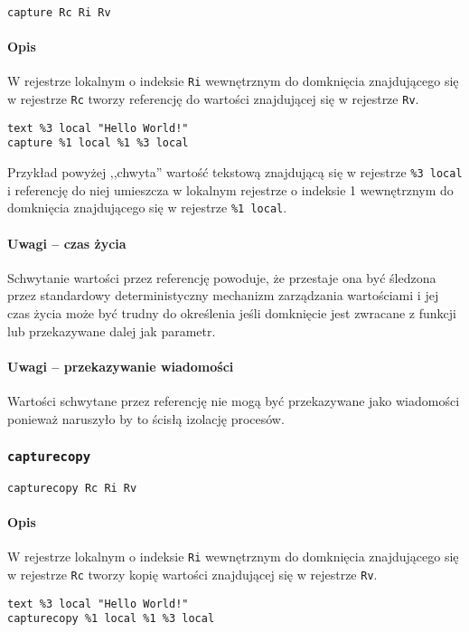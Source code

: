 \begin{lstlisting}
capture Rc Ri Rv
\end{lstlisting}

\paragraph*{Opis} W rejestrze lokalnym o indeksie \texttt{Ri} wewnętrznym do
domknięcia znajdującego się w rejestrze \texttt{Rc} tworzy referencję do
wartości znajdującej się w rejestrze \texttt{Rv}.
\begin{lstlisting}
text %3 local "Hello World!"
capture %1 local %1 %3 local
\end{lstlisting}

Przykład powyżej ,,chwyta'' wartość tekstową znajdującą się w rejestrze
\texttt{\%3~local} i referencję do niej umieszcza w lokalnym rejestrze o
indeksie 1 wewnętrznym do domknięcia znajdującego się w rejestrze
\texttt{\%1~local}.

\paragraph*{Uwagi -- czas życia} Schwytanie wartości przez referencję powoduje,
że przestaje ona być śledzona przez standardowy deterministyczny mechanizm
zarządzania wartościami i jej czas życia może być trudny do określenia jeśli
domknięcie jest zwracane z funkcji lub przekazywane dalej jak parametr.

\paragraph*{Uwagi -- przekazywanie wiadomości} Wartości schwytane przez
referencję nie mogą być przekazywane jako wiadomości ponieważ naruszyło by to
ścisłą izolację procesów.

\subsubsection{\texttt{capturecopy}}

\begin{lstlisting}
capturecopy Rc Ri Rv
\end{lstlisting}

\paragraph*{Opis} W rejestrze lokalnym o indeksie \texttt{Ri} wewnętrznym do
domknięcia znajdującego się w rejestrze \texttt{Rc} tworzy kopię wartości
znajdującej się w rejestrze \texttt{Rv}.
\begin{lstlisting}
text %3 local "Hello World!"
capturecopy %1 local %1 %3 local
\end{lstlisting}

